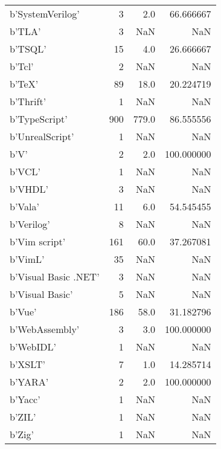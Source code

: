 \begin{table}
\begin{tabular}{lrrr}
b'SystemVerilog'            &               3 &       2.0 &      66.666667 \\
b'TLA'                      &               3 &       NaN &            NaN \\
b'TSQL'                     &              15 &       4.0 &      26.666667 \\
b'Tcl'                      &               2 &       NaN &            NaN \\
b'TeX'                      &              89 &      18.0 &      20.224719 \\
b'Thrift'                   &               1 &       NaN &            NaN \\
b'TypeScript'               &             900 &     779.0 &      86.555556 \\
b'UnrealScript'             &               1 &       NaN &            NaN \\
b'V'                        &               2 &       2.0 &     100.000000 \\
b'VCL'                      &               1 &       NaN &            NaN \\
b'VHDL'                     &               3 &       NaN &            NaN \\
b'Vala'                     &              11 &       6.0 &      54.545455 \\
b'Verilog'                  &               8 &       NaN &            NaN \\
b'Vim script'               &             161 &      60.0 &      37.267081 \\
b'VimL'                     &              35 &       NaN &            NaN \\
b'Visual Basic .NET'        &               3 &       NaN &            NaN \\
b'Visual Basic'             &               5 &       NaN &            NaN \\
b'Vue'                      &             186 &      58.0 &      31.182796 \\
b'WebAssembly'              &               3 &       3.0 &     100.000000 \\
b'WebIDL'                   &               1 &       NaN &            NaN \\
b'XSLT'                     &               7 &       1.0 &      14.285714 \\
b'YARA'                     &               2 &       2.0 &     100.000000 \\
b'Yacc'                     &               1 &       NaN &            NaN \\
b'ZIL'                      &               1 &       NaN &            NaN \\
b'Zig'                      &               1 &       NaN &            NaN \\
\end{tabular}
\end{table}
